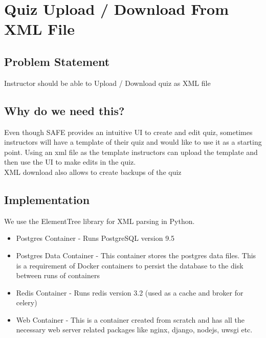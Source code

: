 \clearpage
\section{Quiz Upload / Download From XML File} 
\hspace{0.5cm} 


\subsection{Problem Statement}
	Instructor should be able to Upload / Download quiz as XML file

\subsection{Why do we need this?}
	Even though SAFE provides an intuitive UI to create and edit quiz, sometimes instructors will have a template of their quiz and would like to use it as a starting point. Using an xml file as the template instructors can upload the template and then use the UI to make edits in the quiz.\\
	
	XML download also allows to create backups of the quiz

\subsection{Implementation}
	We use the ElementTree library for XML parsing in Python.

    \begin{itemize}
        \item Postgres Container - Runs PostgreSQL version 9.5
        \item Postgres Data Container - This container stores the postgres data files. This is a requirement of Docker containers to persist the database to the disk between runs of containers
        \item Redis Container - Runs redis version 3.2 (used as a cache and broker for celery)
        \item Web Container - This is a container created from scratch and has all the necessary web server related packages like nginx, django, nodejs, uwsgi etc.
	\end{itemize}
 
 	